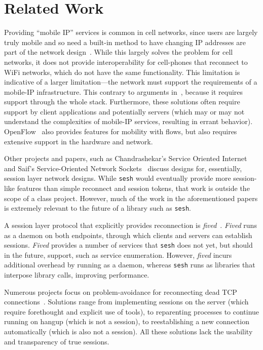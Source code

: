 \documentclass[twocolumn,10pt]{article}
\newcommand{\sesh}{\texttt{sesh}\xspace}
\begin{document}
\section{Related Work}

Providing ``mobile IP'' services is common in cell networks, since users are
largely truly mobile and so need a built-in method to have changing IP addresses
are part of the network design~\cite{ltemob,mobileip,Kurose}. While this largely
solves the problem for cell networks, it does not provide interoperability for
cell-phones that reconnect to WiFi networks, which do not have the same
functionality. This limitation is indicative of a larger limitation---the
network must support the requirements of a mobile-IP infrastructure. This
contrary to arguments in~\cite{Saltzer}, because it requires support through the
whole stack. Furthermore, these solutions often require support by client
applications and potentially servers (which may or may not understand the
complexities of mobile-IP services, resulting in errant behavior).
OpenFlow~\cite{McKeown} also
provides features for mobility with flows, but also requires extensive support
in the hardware and network.

Other projects and papers, such as Chandrashekar's Service Oriented
Internet~\cite{chandrashekar2003service} and Saif's Service-Oriented Network
Sockets~\cite{Saif} discuss designs for, essentially, session layer network designs.
While \sesh would eventually provide more session-like features than
simple reconnect and session tokens, that work is outside the scope of a class
project. However, much of the work in the aforementioned papers is extremely
relevant to the future of a library such as \sesh.

A session layer protocol that explicitly provides reconnection is
\textit{fived}~\cite{wasptr-15-01}. \textit{Fived} runs as a daemon on both
endpoints, through which clients and servers can establish sessions.
\textit{Fived} provides a number of services that \sesh does not yet,
but should in the future, support, such as service enumeration. However,
\textit{fived} incurs additional overhead by running as a daemon, whereas
\sesh runs as libraries that interpose library calls, improving
performance.

Numerous projects focus on problem-avoidance for reconnecting dead TCP
connections~\cite{mosh,autossh,screen,tmux}. Solutions range from implementing
sessions on the server (which require forethought and explicit use of tools), to
reparenting processes to continue running on hangup (which is not a session), to
reestablishing a new connection automatically (which is also not a session). All
these solutions lack the usability and transparency of true sessions.
\end{document}
